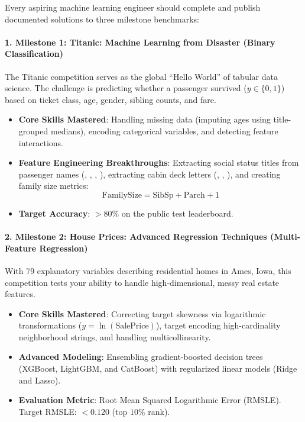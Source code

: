 Every aspiring machine learning engineer should complete and publish documented solutions to three milestone benchmarks:

\paragraph{1. Milestone 1: Titanic: Machine Learning from Disaster (Binary Classification)}
The Titanic competition serves as the global ``Hello World'' of tabular data science. The challenge is predicting whether a passenger survived ($y \in \{0, 1\}$) based on ticket class, age, gender, sibling counts, and fare.
\begin{itemize}
    \item \textbf{Core Skills Mastered}: Handling missing data (imputing ages using title-grouped medians), encoding categorical variables, and detecting feature interactions.
    \item \textbf{Feature Engineering Breakthroughs}: Extracting social status titles from passenger names (, , , ), extracting cabin deck letters (, , ), and creating family size metrics:
    \begin{equation}
    \text{FamilySize} = \text{SibSp} + \text{Parch} + 1
    \end{equation}
    \item \textbf{Target Accuracy}: $> 80\%$ on the public test leaderboard.
\end{itemize}

\paragraph{2. Milestone 2: House Prices: Advanced Regression Techniques (Multi-Feature Regression)}
With 79 explanatory variables describing residential homes in Ames, Iowa, this competition tests your ability to handle high-dimensional, messy real estate features.
\begin{itemize}
    \item \textbf{Core Skills Mastered}: Correcting target skewness via logarithmic transformations ($y = \ln(\text{SalePrice})$), target encoding high-cardinality neighborhood strings, and handling multicollinearity.
    \item \textbf{Advanced Modeling}: Ensembling gradient-boosted decision trees (XGBoost, LightGBM, and CatBoost) with regularized linear models (Ridge and Lasso).
    \item \textbf{Evaluation Metric}: Root Mean Squared Logarithmic Error (RMSLE). Target RMSLE: $< 0.120$ (top $10\%$ rank).
\end{itemize}

